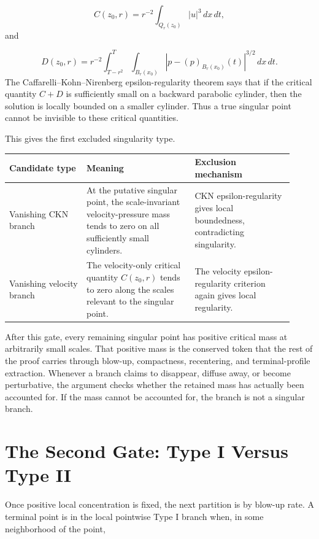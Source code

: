 \documentclass[11pt]{amsart}
\begin{document}
\[
  C(z_0,r)=r^{-2}\int_{Q_r(z_0)} |u|^3\,dx\,dt,
\]
and

\[
  D(z_0,r)=r^{-2}\int_{T-r^2}^{T}\int_{B_r(x_0)}
  |p-(p)_{B_r(x_0)}(t)|^{3/2}\,dx\,dt.
\]
The Caffarelli--Kohn--Nirenberg epsilon-regularity theorem says that if the critical quantity \(C+D\) is sufficiently small on a backward parabolic cylinder, then the solution is locally bounded on a smaller cylinder.  Thus a true singular point cannot be invisible to these critical quantities.

This gives the first excluded singularity type.

\begin{longtable}{@{}>{\raggedright\arraybackslash}p{0.25\linewidth}>{\raggedright\arraybackslash}p{0.35\linewidth}>{\raggedright\arraybackslash}p{0.32\linewidth}@{}}
\toprule
\textbf{Candidate type} & \textbf{Meaning} & \textbf{Exclusion mechanism} \\
\midrule
\endhead
Vanishing CKN branch & At the putative singular point, the scale-invariant velocity-pressure mass tends to zero on all sufficiently small cylinders. & CKN epsilon-regularity gives local boundedness, contradicting singularity. \\
Vanishing velocity branch & The velocity-only critical quantity \(C(z_0,r)\) tends to zero along the scales relevant to the singular point. & The velocity epsilon-regularity criterion again gives local regularity. \\
\bottomrule
\end{longtable}

After this gate, every remaining singular point has positive critical mass at arbitrarily small scales.  That positive mass is the conserved token that the rest of the proof carries through blow-up, compactness, recentering, and terminal-profile extraction.  Whenever a branch claims to disappear, diffuse away, or become perturbative, the argument checks whether the retained mass has actually been accounted for.  If the mass cannot be accounted for, the branch is not a singular branch.

\section{The Second Gate: Type I Versus Type II}

Once positive local concentration is fixed, the next partition is by blow-up rate.  A terminal point is in the local pointwise Type I branch when, in some neighborhood of the point,
\end{document}
